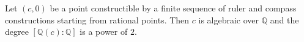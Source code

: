 Let $(c,0)$ be a point constructible by a finite sequence of ruler and compass constructions starting from rational points. Then $c$ is algebraic over $\mathbb{Q}$ and the degree $[\mathbb{Q}(c):\mathbb{Q}]$ is a power of $2$.
